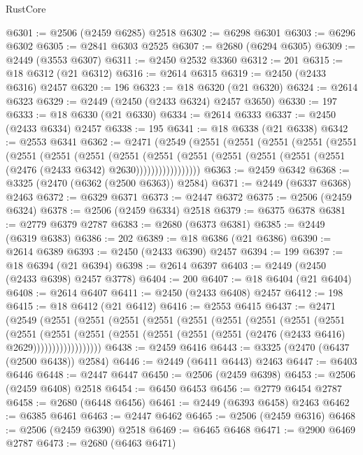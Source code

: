 \begin{lexlean}{RustCore}
\begin{coremodule}
@6301 := @2506 (@2459 @6285) @2518
@6302 := @6298 @6301
@6303 := @6296 @6302
@6305 := @2841 @6303 @2525
@6307 := @2680 (@6294 @6305)
@6309 := @2449 (@3553 @6307)
@6311 := @2450 @2532 @3360
@6312 := 201
@6315 := @18 @6312 (@21 @6312)
@6316 := @2614 @6315
@6319 := @2450 (@2433 @6316) @2457
@6320 := 196
@6323 := @18 @6320 (@21 @6320)
@6324 := @2614 @6323
@6329 := @2449 (@2450 (@2433 @6324) @2457 @3650)
@6330 := 197
@6333 := @18 @6330 (@21 @6330)
@6334 := @2614 @6333
@6337 := @2450 (@2433 @6334) @2457
@6338 := 195
@6341 := @18 @6338 (@21 @6338)
@6342 := @2553 @6341
@6362 := @2471
    (@2549
      (@2551
        (@2551
          (@2551
            (@2551
              (@2551
                (@2551
                  (@2551
                    (@2551
                      (@2551
                        (@2551
                          (@2551
                            (@2551 (@2551 (@2551 (@2551 (@2476 (@2433 @6342) @2630)))))))))))))))))
@6363 := @2459 @6342
@6368 := @3325 (@2470 (@6362 (@2500 @6363)) @2584)
@6371 := @2449 (@6337 @6368) @2463
@6372 := @6329 @6371
@6373 := @2447 @6372
@6375 := @2506 (@2459 @6324)
@6378 := @2506 (@2459 @6334) @2518
@6379 := @6375 @6378
@6381 := @2779 @6379 @2787
@6383 := @2680 (@6373 @6381)
@6385 := @2449 (@6319 @6383)
@6386 := 202
@6389 := @18 @6386 (@21 @6386)
@6390 := @2614 @6389
@6393 := @2450 (@2433 @6390) @2457
@6394 := 199
@6397 := @18 @6394 (@21 @6394)
@6398 := @2614 @6397
@6403 := @2449 (@2450 (@2433 @6398) @2457 @3778)
@6404 := 200
@6407 := @18 @6404 (@21 @6404)
@6408 := @2614 @6407
@6411 := @2450 (@2433 @6408) @2457
@6412 := 198
@6415 := @18 @6412 (@21 @6412)
@6416 := @2553 @6415
@6437 := @2471
    (@2549
      (@2551
        (@2551
          (@2551
            (@2551
              (@2551
                (@2551
                  (@2551
                    (@2551
                      (@2551
                        (@2551
                          (@2551
                            (@2551
                              (@2551
                                (@2551 (@2551 (@2551 (@2476 (@2433 @6416) @2629))))))))))))))))))
@6438 := @2459 @6416
@6443 := @3325 (@2470 (@6437 (@2500 @6438)) @2584)
@6446 := @2449 (@6411 @6443) @2463
@6447 := @6403 @6446
@6448 := @2447 @6447
@6450 := @2506 (@2459 @6398)
@6453 := @2506 (@2459 @6408) @2518
@6454 := @6450 @6453
@6456 := @2779 @6454 @2787
@6458 := @2680 (@6448 @6456)
@6461 := @2449 (@6393 @6458) @2463
@6462 := @6385 @6461
@6463 := @2447 @6462
@6465 := @2506 (@2459 @6316)
@6468 := @2506 (@2459 @6390) @2518
@6469 := @6465 @6468
@6471 := @2900 @6469 @2787
@6473 := @2680 (@6463 @6471)

\end{coremodule}
\end{lexlean}
